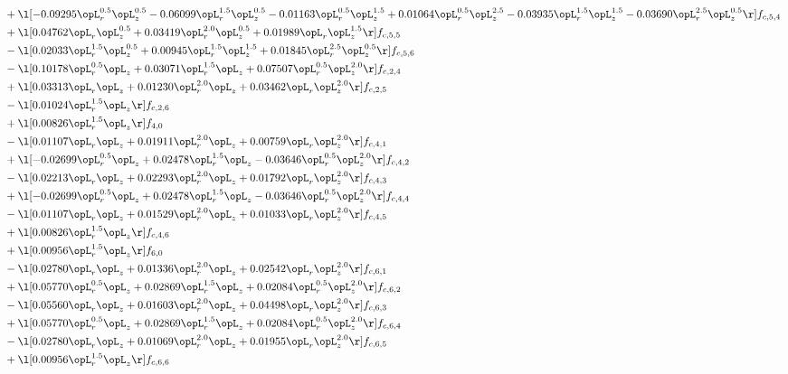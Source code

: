 \begin{alignat}{2}
& + \l[  -0.09295 \opL_r^{0.5} \opL_z^{0.5}   -0.06099 \opL_r^{1.5} \opL_z^{0.5}   -0.01163 \opL_r^{0.5} \opL_z^{1.5} +  0.01064 \opL_r^{0.5} \opL_z^{2.5}   -0.03935 \opL_r^{1.5} \opL_z^{1.5}   -0.03690 \opL_r^{2.5} \opL_z^{0.5}  \r] f_{c,5,4} \nonumber \\ 
& + \l[  0.04762 \opL_r \opL_z^{0.5} +  0.03419 \opL_r^{2.0} \opL_z^{0.5} +  0.01989 \opL_r \opL_z^{1.5}  \r] f_{c,5,5} \nonumber \\ 
& - \l[  0.02033 \opL_r^{1.5} \opL_z^{0.5} +  0.00945 \opL_r^{1.5} \opL_z^{1.5} +  0.01845 \opL_r^{2.5} \opL_z^{0.5}  \r] f_{c,5,6} \nonumber \\ 
& - \l[  0.10178 \opL_r^{0.5} \opL_z +  0.03071 \opL_r^{1.5} \opL_z +  0.07507 \opL_r^{0.5} \opL_z^{2.0}  \r] f_{c,2,4} \nonumber \\ 
& + \l[  0.03313 \opL_r \opL_z +  0.01230 \opL_r^{2.0} \opL_z +  0.03462 \opL_r \opL_z^{2.0}  \r] f_{c,2,5} \nonumber \\ 
& - \l[  0.01024 \opL_r^{1.5} \opL_z  \r] f_{c,2,6} \nonumber \\ 
& + \l[  0.00826 \opL_r^{1.5} \opL_z  \r] f_{4,0} \nonumber \\ 
& - \l[  0.01107 \opL_r \opL_z +  0.01911 \opL_r^{2.0} \opL_z +  0.00759 \opL_r \opL_z^{2.0}  \r] f_{c,4,1} \nonumber \\ 
& + \l[  -0.02699 \opL_r^{0.5} \opL_z +  0.02478 \opL_r^{1.5} \opL_z   -0.03646 \opL_r^{0.5} \opL_z^{2.0}  \r] f_{c,4,2} \nonumber \\ 
& - \l[  0.02213 \opL_r \opL_z +  0.02293 \opL_r^{2.0} \opL_z +  0.01792 \opL_r \opL_z^{2.0}  \r] f_{c,4,3} \nonumber \\ 
& + \l[  -0.02699 \opL_r^{0.5} \opL_z +  0.02478 \opL_r^{1.5} \opL_z   -0.03646 \opL_r^{0.5} \opL_z^{2.0}  \r] f_{c,4,4} \nonumber \\ 
& - \l[  0.01107 \opL_r \opL_z +  0.01529 \opL_r^{2.0} \opL_z +  0.01033 \opL_r \opL_z^{2.0}  \r] f_{c,4,5} \nonumber \\ 
& + \l[  0.00826 \opL_r^{1.5} \opL_z  \r] f_{c,4,6} \nonumber \\ 
& + \l[  0.00956 \opL_r^{1.5} \opL_z  \r] f_{6,0} \nonumber \\ 
& - \l[  0.02780 \opL_r \opL_z +  0.01336 \opL_r^{2.0} \opL_z +  0.02542 \opL_r \opL_z^{2.0}  \r] f_{c,6,1} \nonumber \\ 
& + \l[  0.05770 \opL_r^{0.5} \opL_z +  0.02869 \opL_r^{1.5} \opL_z +  0.02084 \opL_r^{0.5} \opL_z^{2.0}  \r] f_{c,6,2} \nonumber \\ 
& - \l[  0.05560 \opL_r \opL_z +  0.01603 \opL_r^{2.0} \opL_z +  0.04498 \opL_r \opL_z^{2.0}  \r] f_{c,6,3} \nonumber \\ 
& + \l[  0.05770 \opL_r^{0.5} \opL_z +  0.02869 \opL_r^{1.5} \opL_z +  0.02084 \opL_r^{0.5} \opL_z^{2.0}  \r] f_{c,6,4} \nonumber \\ 
& - \l[  0.02780 \opL_r \opL_z +  0.01069 \opL_r^{2.0} \opL_z +  0.01955 \opL_r \opL_z^{2.0}  \r] f_{c,6,5} \nonumber \\ 
& + \l[  0.00956 \opL_r^{1.5} \opL_z  \r] f_{c,6,6} \nonumber \\ 
\end{alignat} 


